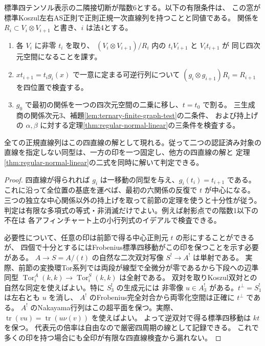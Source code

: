 \begin{theorem}\label{thm:finite-normal-line-recognition}
標準四テンソル表示の二隣接切断が階数6とする。以下の有限条件は、
この窓が標準Koszul左右AS正則で正則正規一次直線列を持つことと同値である。
関係を $R_i\subset V_i\otimes V_{i+1}$ と書き、$i$ は法4とする。
\begin{enumerate}
\item 各 $V_i$ に非零 $t_i$ を取り、
$(V_i\otimes V_{i+1})/R_i$ 内の $t_i V_{i+1}$ と $V_i t_{i+1}$ が
同じ四次元空間になることを課す。
\item $x t_{i+1}=t_i g_i(x)$ で一意に定まる可逆行列について
$(g_i\otimes g_{i+1})R_i=R_{i+1}$ を四位置で検査する。
\item $g_0$ で最初の関係を一つの四次元空間の二乗に移し、$t=t_0$ で割る。
三生成商の関係次元3、補題\ref{lem:ternary-finite-graph-test}の二条件、
および持上げの $\alpha,\beta$ に対する定理\ref{thm:regular-normal-linear}の三条件を検査する。
\end{enumerate}
全ての正規直線列はこの四直線の解として現れる。従って二つの認証済み対象の
直線を指定しない同型は、一方の印を一つ固定し、他方の四直線の解と
定理\ref{thm:regular-normal-linear}の二式を同時に解いて判定できる。
\end{theorem}
\begin{proof}
四直線が得られれば $g_i$ は一移動の同型を与え、$g_i(t_i)=t_{i+1}$ である。
これに沿って全位置の基底を運べば、最初の六関係の反復で $t$ が中心になる。
三つの独立な中心関係以外の持上げを取って前節の定理を使うと十分性が従う。
判定は有限な多項式の等式・非消滅だけでよい。例えば射影点での階数1以下の不在は
各アフィンチャート上の小行列式のイデアルで検査できる。

必要性について、任意の印は前節で得る中心正則元 $t$ の形にすることができるが、
四個で十分とするにはFrobenius標準四移動がこの印を保つことを示す必要がある。
$A\to S=A/(t)$ の自然な二次双対写像 $S^!\to A^!$ は単射である。
実際、前節の変換環Tor系列では両段が線型で全微分が零であるから下段への辺準同型
$\operatorname{Tor}^A_i(k,k)\to\operatorname{Tor}^S_i(k,k)$ は全射である。
双対を取りKoszul双対との自然な同定を使えばよい。特に $S^!_3$ の生成元には
非零像 $u\in A^!_3$ がある。$t^\perp=S^!_1$ は左右とも $u$ を消し、
$A^!$ のFrobenius完全対合から両零化空間は正確に $t^\perp$ である。
$A^!$ のNakayama行列はこの超平面を保つ。実際、
$\operatorname{tr}(v u)=\operatorname{tr}(u\nu(v))$ を使えばよい。
よって逆双対で得る標準四移動は $kt$ を保つ。
代表元の倍率は自由なので厳密四周期の線として記録できる。
これで多くの印を持つ場合にも全印が有限な四直線検査から漏れない。
\end{proof}

